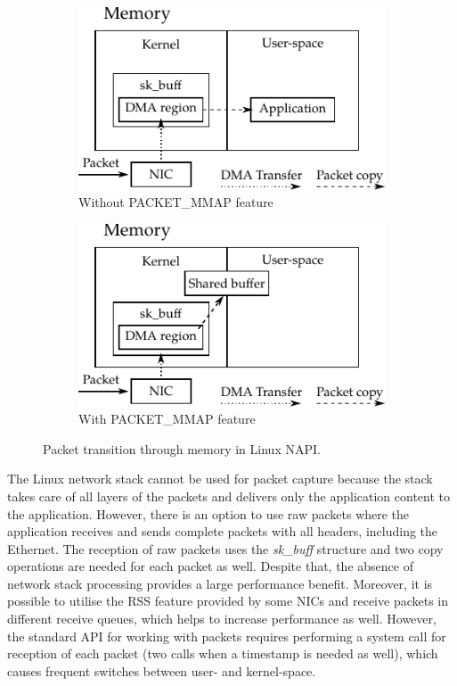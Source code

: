 \begin{figure}[!tb]
    \centering
    \begin{subfigure}[t]{0.5\textwidth}
        \includegraphics{figures/c05/NAPI}
        \caption{Without PACKET\_MMAP feature}
        \label{fig:NAPI_no_MMAP}
    \end{subfigure}%
    \begin{subfigure}[t]{0.5\textwidth}
        \includegraphics{figures/c05/NAPI_MMAP}
        \caption{With PACKET\_MMAP feature}
        \label{fig:NAPI_MMAP}
    \end{subfigure}
    \caption{Packet transition through memory in Linux NAPI.}
    \label{fig:NAPI}
\end{figure}

The Linux network stack cannot be used for packet capture because the stack takes care of all layers of the packets and delivers only the application content to the application. However, there is an option to use raw packets where the application receives and sends complete packets with all headers, including the Ethernet. The reception of raw packets uses the \emph{sk\_buff} structure and two copy operations are needed for each packet as well. Despite that, the absence of network stack processing provides a large performance benefit. Moreover, it is possible to utilise the RSS feature provided by some NICs and receive packets in different receive queues, which helps to increase performance as well. However, the standard API for working with packets requires performing a system call for reception of each packet (two calls when a timestamp is needed as well), which causes frequent switches between user- and kernel-space.


